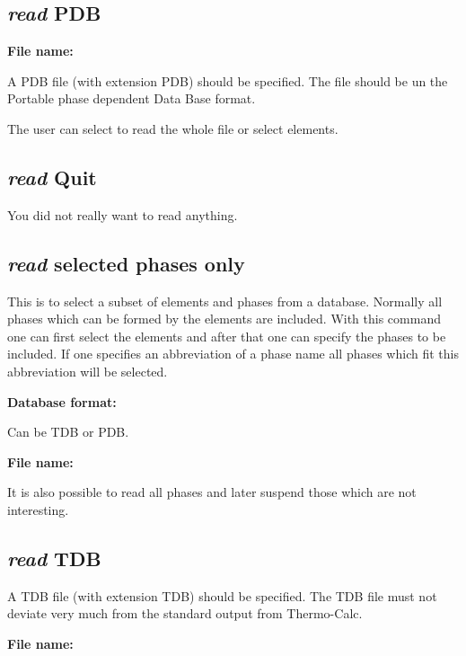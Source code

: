 \documentclass[11pt]{article}
\begin{document}
\hypertarget{Read PDB}{}
\subsection{{\em read} PDB}

{\bf File name:}

A PDB file (with extension PDB) should be specified.  The file
should be un the Portable phase dependent Data Base format.

The user can select to read the whole file or select elements.

\hypertarget{Read quit}{}
\subsection{{\em read} Quit}

You did not really want to read anything.

\hypertarget{Read select phase}{}
\subsection{{\em read} selected phases only}

This is to select a subset of elements and phases from a database.
Normally all phases which can be formed by the elements are included.
With this command one can first select the elements and after that one
can specify the phases to be included.  If one specifies an
abbreviation of a phase name all phases which fit this abbreviation
will be selected.

{\bf Database format:}

Can be TDB or PDB.

{\bf File name:}

It is also possible to read all phases and later suspend those which
are not interesting.

\hypertarget{Read tdb}{}
\hypertarget{Read TDB}{}
\subsection{{\em read} TDB}

A TDB file (with extension TDB) should be specified.  The TDB file
must not deviate very much from the standard output from Thermo-Calc.

\hypertarget{File name:}{{\bf File name:}}
\end{document}
